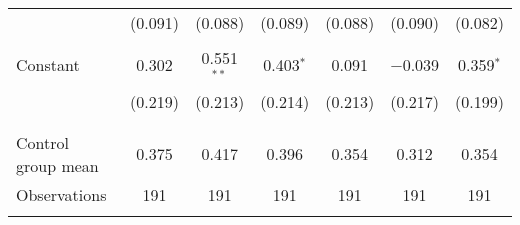 \begin{tabular}{@{\extracolsep{5pt}}lcccccc}
  & (0.091) & (0.088) & (0.089) & (0.088) & (0.090) & (0.082) \\ 
  & & & & & & \\ 
 Constant & 0.302 & 0.551$^{**}$ & 0.403$^{*}$ & 0.091 & $-$0.039 & 0.359$^{*}$ \\ 
  & (0.219) & (0.213) & (0.214) & (0.213) & (0.217) & (0.199) \\ 
  & & & & & & \\ 
\hline \\[-1.8ex] 
Control group mean & 0.375 & 0.417 & 0.396 & 0.354 & 0.312 & 0.354 \\ 
Observations & 191 & 191 & 191 & 191 & 191 & 191 \\ 
\hline 
\hline \\[-1.8ex] 
\end{tabular} 
